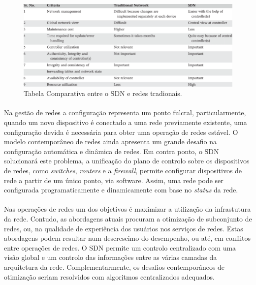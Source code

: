 \documentclass{llncs}
\begin{document}
\paragraph{}
\begin{figure}
\begin{center}
\includegraphics[scale=0.40]{tabela.png} 
\end{center}
\caption{Tabela Comparativa entre o SDN e redes tradionais.}
\label{fig:tabela}
\end{figure} 
\paragraph{}
Na gestão de redes a configuração representa um ponto fulcral, particularmente, quando um novo dispositivo é conectado a uma rede previamente existente, uma configuração
devida é necessária para obter uma operação de redes estável. O modelo contemporâneo de redes ainda apresenta um grande desafio na configuração automática e dinâmica de redes.
Em contra ponto, o SDN solucionará este problema, a unificação do plano de controlo sobre os dispositivos de redes, como \textit{switches}, \textit{routers} e a \textit{firewall},
permite configurar dispositivos de rede a partir de um único ponto, via software. Assim, uma rede pode ser configurada programaticamente e dinamicamente com base no \textit{status} da rede. \cite{paper1}
\paragraph{}
Nas operações de redes um dos objetivos é maximizar a utilização da infrastutura da rede. Contudo, as abordagens atuais procuram a otimização de subconjunto de redes, ou,
na qualidade de experiência dos usuários nos serviços de redes. Estas abordagens podem resultar num descrescimo do desempenho, ou até, em conflitos entre operações de redes. 
O SDN permite um controlo centralizado com uma visão global e um controlo das informações entre as várias camadas da arquitetura da rede. Complementarmente, os desafios contemporâneos
de otimização seriam resolvidos com algoritmos centralizados adequados.
\end{document}
